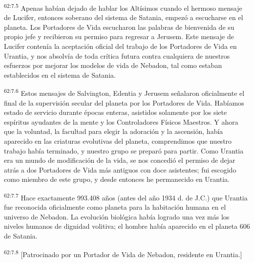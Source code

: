 \par
\textsuperscript{62:7.5} Apenas habían dejado de hablar los Altísimos cuando el hermoso mensaje de Lucifer, entonces soberano del sistema de Satania, empezó a escucharse en el planeta. Los Portadores de Vida escucharon las palabras de bienvenida de su propio jefe y recibieron su permiso para regresar a Jerusem. Este mensaje de Lucifer contenía la aceptación oficial del trabajo de los Portadores de Vida en Urantia, y nos absolvía de toda crítica futura contra cualquiera de nuestros esfuerzos por mejorar los modelos de vida de Nebadon, tal como estaban establecidos en el sistema de Satania.

\par
\textsuperscript{62:7.6} Estos mensajes de Salvington, Edentia y Jerusem señalaron oficialmente el final de la supervisión secular del planeta por los Portadores de Vida. Habíamos estado de servicio durante épocas enteras, asistidos solamente por los siete espíritus ayudantes de la mente y los Controladores Físicos Maestros. Y ahora que la voluntad, la facultad para elegir la adoración y la ascensión, había aparecido en las criaturas evolutivas del planeta, comprendimos que nuestro trabajo había terminado, y nuestro grupo se preparó para partir. Como Urantia era un mundo de modificación de la vida, se nos concedió el permiso de dejar atrás a dos Portadores de Vida más antiguos con doce asistentes; fui escogido como miembro de este grupo, y desde entonces he permanecido en Urantia.

\par
\textsuperscript{62:7.7} Hace exactamente 993.408 años (antes del año 1934 d. de J.C.) que Urantia fue reconocida oficialmente como planeta para la habitación humana en el universo de Nebadon. La evolución biológica había logrado una vez más los niveles humanos de dignidad volitiva; el hombre había aparecido en el planeta 606 de Satania.

\par
\textsuperscript{62:7.8} [Patrocinado por un Portador de Vida de Nebadon, residente en Urantia.]